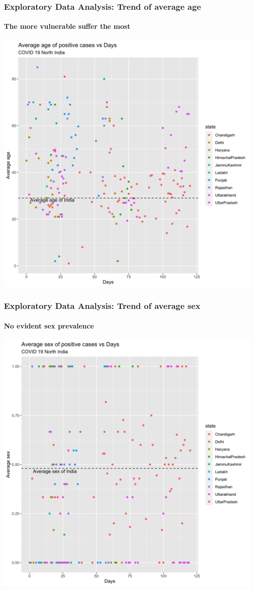 \documentclass{beamer}
\begin{document}
{\begin{frame}
\end{frame}
\begin{frame}
	\frametitle{Exploratory Data Analysis: Trend of average age}
	\framesubtitle{The more vulnerable suffer the most}
	\center \includegraphics[scale = 0.085]{avg_age_pos.png}
\end{frame}
\begin{frame}
	\frametitle{Exploratory Data Analysis: Trend of average sex}
	\framesubtitle{No evident sex prevalence}
	\center \includegraphics[scale = 0.085]{avg_sex_pos.png}
\end{frame}
}
\end{document}
